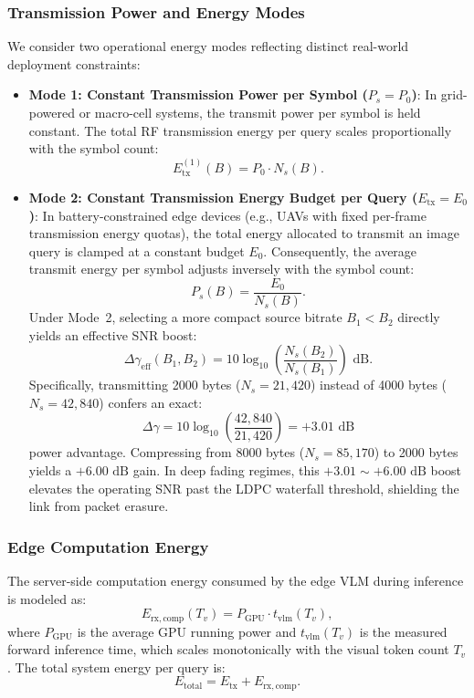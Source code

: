 \subsubsection{Transmission Power and Energy Modes}
We consider two operational energy modes reflecting distinct real-world deployment constraints:
\begin{itemize}
    \item \textbf{Mode 1: Constant Transmission Power per Symbol ($P_s = P_0$)}: In grid-powered or macro-cell systems, the transmit power per symbol is held constant. The total RF transmission energy per query scales proportionally with the symbol count:
    \begin{equation}
    E_{\mathrm{tx}}^{(1)}(B) = P_0 \cdot N_s(B).
    \end{equation}
    \item \textbf{Mode 2: Constant Transmission Energy Budget per Query ($E_{\mathrm{tx}} = E_0$)}: In battery-constrained edge devices (e.g., UAVs with fixed per-frame transmission energy quotas), the total energy allocated to transmit an image query is clamped at a constant budget $E_0$. Consequently, the average transmit energy per symbol adjusts inversely with the symbol count:
    \begin{equation}
    P_s(B) = \frac{E_0}{N_s(B)}.
    \end{equation}
    Under Mode~2, selecting a more compact source bitrate $B_1 < B_2$ directly yields an effective SNR boost:
    \begin{equation}\label{eq:snr_gain}
    \Delta \gamma_{\mathrm{eff}}(B_1, B_2) = 10 \log_{10}\left(\frac{N_s(B_2)}{N_s(B_1)}\right) \text{ dB}.
    \end{equation}
    Specifically, transmitting 2000 bytes ($N_s = 21{,}420$) instead of 4000 bytes ($N_s = 42{,}840$) confers an exact:
    \begin{equation}
    \Delta \gamma = 10 \log_{10}\left(\frac{42{,}840}{21{,}420}\right) = +3.01\text{ dB}
    \end{equation}
    power advantage. Compressing from 8000 bytes ($N_s = 85{,}170$) to 2000 bytes yields a $+6.00\text{ dB}$ gain. In deep fading regimes, this $+3.01\sim+6.00\text{ dB}$ boost elevates the operating SNR past the LDPC waterfall threshold, shielding the link from packet erasure.
\end{itemize}

\subsubsection{Edge Computation Energy}
The server-side computation energy consumed by the edge VLM during inference is modeled as:
\begin{equation}
E_{\mathrm{rx,comp}}(T_v) = P_{\mathrm{GPU}} \cdot t_{\mathrm{vlm}}(T_v),
\end{equation}
where $P_{\mathrm{GPU}}$ is the average GPU running power and $t_{\mathrm{vlm}}(T_v)$ is the measured forward inference time, which scales monotonically with the visual token count $T_v$. The total system energy per query is:
\begin{equation}
E_{\mathrm{total}} = E_{\mathrm{tx}} + E_{\mathrm{rx,comp}}.
\end{equation}

